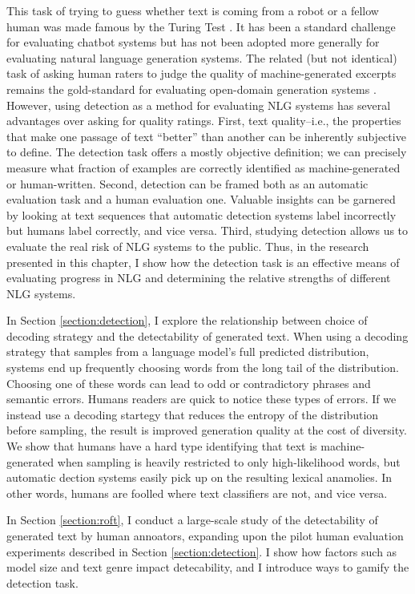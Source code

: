 This task of trying to guess whether text is coming from a robot or a fellow human was made famous by the Turing Test \citep{turing1950computing}.
It has been a standard challenge for evaluating chatbot systems \citep{lowe2017towards,deriu2020spot} but has not been adopted more generally for evaluating natural language generation systems.
The related (but not identical) task of asking human raters to judge the quality of machine-generated excerpts remains the gold-standard for evaluating open-domain generation systems \citep{van2019best}.
However, using detection as a method for evaluating NLG systems has several advantages over asking for quality ratings.
First, text quality--i.e., the properties that make one passage of text ``better'' than another can be inherently subjective to define.
The detection task offers a mostly objective definition; we can precisely measure what fraction of examples are correctly identified as machine-generated or human-written.
Second, detection can be framed both as an automatic evaluation task and a human evaluation one.
Valuable insights can be garnered by looking at text sequences that automatic detection systems label incorrectly but humans label correctly, and vice versa.
Third, studying detection allows us to evaluate the real risk of NLG systems to the public.
Thus, in the research presented in this chapter, I show how the detection task is an effective means of evaluating progress in NLG and determining the relative strengths of different NLG systems.

In Section \ref{section:detection}, I explore the relationship between choice of decoding strategy and the detectability of generated text.
When using a decoding strategy that samples from a language model's full predicted distribution, systems end up frequently choosing words from the long tail of the distribution.
Choosing one of these words can lead to odd or contradictory phrases and semantic errors.
Humans readers are quick to notice these types of errors.
If we instead use a decoding startegy that reduces the entropy of the distribution before sampling, the result is improved generation quality at the cost of diversity.
We show that humans have a hard type identifying that text is machine-generated when sampling is heavily restricted to only high-likelihood words, but automatic dection systems easily pick up on the resulting lexical anamolies.
In other words, humans are foolled where text classifiers are not, and vice versa.

In Section \ref{section:roft}, I conduct a large-scale study of the detectability of generated text by human annoators, expanding upon the pilot human evaluation experiments described in Section \ref{section:detection}.
I show how factors such as model size and text genre impact detecability, and I introduce ways to gamify the detection task.

